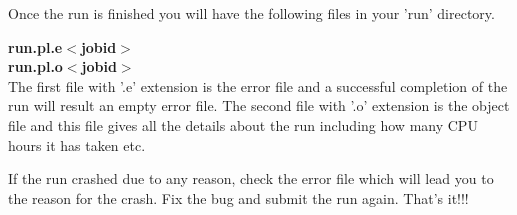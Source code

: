 Once the run is finished you will have the following files in your
'run' directory. 

\textbf{run.pl.e$<$jobid$>$}\\
\textbf{run.pl.o$<$jobid$>$}\\

The first file with '.e' extension is the error file and a successful
completion of the run will result an empty error file.  The second
file with '.o' extension is the object file and this file gives all the
details about the run including how many CPU hours it has taken etc.  

If the run crashed due to any reason, check the error file which will
lead you to the reason for the crash.  Fix the bug and submit the run
again.  That's it!!!  


